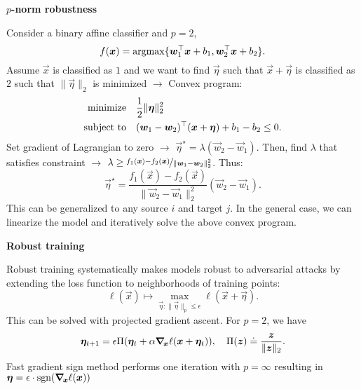 \documentclass[10pt]{article}
\newenvironment{topic}[1]
{\textbf{\sffamily \colorbox{black}{\rlap{\textbf{\textcolor{white}{#1}}}\hspace{\linewidth}\hspace{-2\fboxsep}}}}
{}
\newenvironment{subtopic}[1]
{\begin{center}\textbf{\sffamily #1}\end{center}}
{}
\begin{document}
\begin{multicols*}{3}
\begin{topic}{Adversarial attacks}
\begin{subtopic}{$p$-norm robustness}
            Consider a binary affine classifier and $p=2$, \[
                f(\vec{x}) = \argmax \{ \transpose{\vec{w}_1} \vec{x} + b_1, \transpose{\vec{w}_2}\vec{x} + b_2 \}.
            \]
            Assume $\vec{x}$ is classified as $1$ and we want to find $\vec{\eta}$ such that $\vec{x} +
                \vec{\eta}$ is classified as $2$ such that $\| \vec{\eta} \|_2$ is minimized $\to$ Convex program:
            \begin{align*}
                \text{minimize}   & \quad \frac{1}{2} \| \vec{\eta} \|_2^2                                               \\
                \text{subject to} & \quad \transpose{(\vec{w}_1 - \vec{w}_2)} (\vec{x} + \vec{\eta}) + b_1 - b_2 \leq 0.
            \end{align*}
            Set gradient of Lagrangian to zero $\to$ $\vec{\eta}^\star = \lambda (\vec{w}_2 -
                \vec{w}_1)$. Then, find $\lambda$ that satisfies constraint $\to$ $\lambda \geq
                \nicefrac{f_1(\vec{x}) - f_2(\vec{x})}{\| \vec{w}_1 - \vec{w}_2 \|_2^2}$. Thus: \[
                \vec{\eta}^\star = \frac{f_1(\vec{x}) - f_2(\vec{x})}{\| \vec{w}_2 - \vec{w}_1 \|_2^2} (\vec{w}_2 - \vec{w}_1).
            \]
            This can be generalized to any source $i$ and target $j$. In the general case, we can linearize the
            model and iteratively solve the above convex program.
        \end{subtopic}

        \begin{subtopic}{Robust training}
            Robust training systematically makes models robust to adversarial attacks by extending the loss function to neighborhoods of training points: \[
                \ell(\vec{x}) \mapsto \max_{\vec{\eta} : \| \vec{\eta} \|_p \leq \epsilon} \ell(\vec{x} + \vec{\eta}).
            \]
            This can be solved with projected gradient ascent. For $p=2$, we have \[
                \vec{\eta}_{t+1} = \epsilon \Pi(\vec{\eta}_t + \alpha \grad{\ell(\vec{x} + \vec{\eta}_t)}{\vec{x}}), \quad \Pi(\vec{z}) \doteq \frac{\vec{z}}{\| \vec{z} \|_2}.
            \]
            Fast gradient sign method performs one iteration with $p=\infty$ resulting in $\vec{\eta} =
                \epsilon\cdot\mathrm{sgn}(\grad{\ell(\vec{x})}{\vec{x}})$

        \end{subtopic}

    \end{topic}

\end{multicols*}
\end{document}
